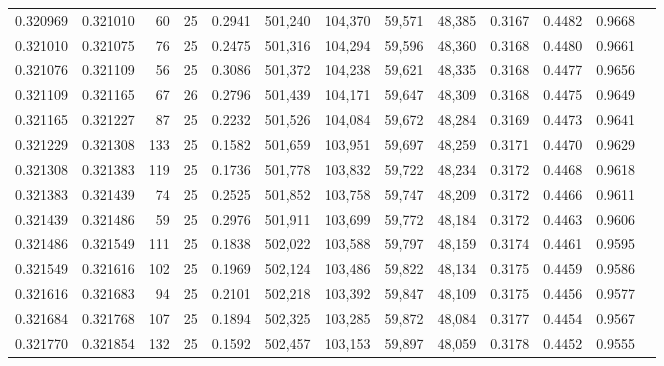 \begin{tabular}{rrrrrrrrrrrrr}
0.320969 & 0.321010 &    60 &  25 &                                     0.2941 & 501,240 & 104,370 &  59,571 &  48,385 & 0.3167 & 0.4482 & 0.9668 \\
0.321010 & 0.321075 &    76 &  25 &                                     0.2475 & 501,316 & 104,294 &  59,596 &  48,360 & 0.3168 & 0.4480 & 0.9661 \\
0.321076 & 0.321109 &    56 &  25 &                                     0.3086 & 501,372 & 104,238 &  59,621 &  48,335 & 0.3168 & 0.4477 & 0.9656 \\
0.321109 & 0.321165 &    67 &  26 &                                     0.2796 & 501,439 & 104,171 &  59,647 &  48,309 & 0.3168 & 0.4475 & 0.9649 \\
0.321165 & 0.321227 &    87 &  25 &                                     0.2232 & 501,526 & 104,084 &  59,672 &  48,284 & 0.3169 & 0.4473 & 0.9641 \\
0.321229 & 0.321308 &   133 &  25 &                                     0.1582 & 501,659 & 103,951 &  59,697 &  48,259 & 0.3171 & 0.4470 & 0.9629 \\
0.321308 & 0.321383 &   119 &  25 &                                     0.1736 & 501,778 & 103,832 &  59,722 &  48,234 & 0.3172 & 0.4468 & 0.9618 \\
0.321383 & 0.321439 &    74 &  25 &                                     0.2525 & 501,852 & 103,758 &  59,747 &  48,209 & 0.3172 & 0.4466 & 0.9611 \\
0.321439 & 0.321486 &    59 &  25 &                                     0.2976 & 501,911 & 103,699 &  59,772 &  48,184 & 0.3172 & 0.4463 & 0.9606 \\
0.321486 & 0.321549 &   111 &  25 &                                     0.1838 & 502,022 & 103,588 &  59,797 &  48,159 & 0.3174 & 0.4461 & 0.9595 \\
0.321549 & 0.321616 &   102 &  25 &                                     0.1969 & 502,124 & 103,486 &  59,822 &  48,134 & 0.3175 & 0.4459 & 0.9586 \\
0.321616 & 0.321683 &    94 &  25 &                                     0.2101 & 502,218 & 103,392 &  59,847 &  48,109 & 0.3175 & 0.4456 & 0.9577 \\
0.321684 & 0.321768 &   107 &  25 &                                     0.1894 & 502,325 & 103,285 &  59,872 &  48,084 & 0.3177 & 0.4454 & 0.9567 \\
0.321770 & 0.321854 &   132 &  25 &                                     0.1592 & 502,457 & 103,153 &  59,897 &  48,059 & 0.3178 & 0.4452 & 0.9555 \\

\end{tabular}
